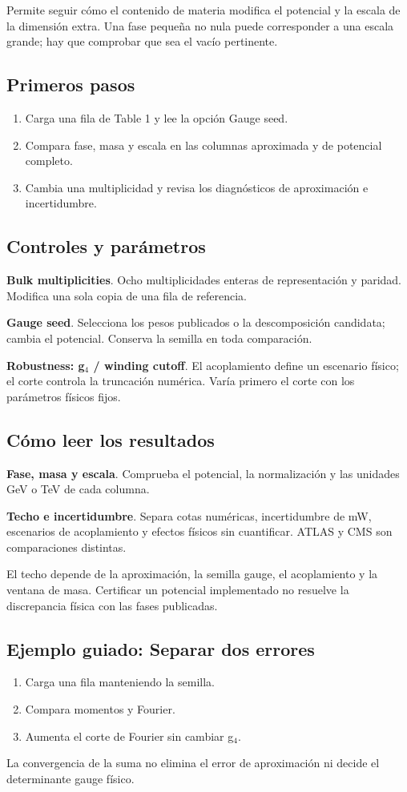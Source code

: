 \documentclass[11pt,a4paper]{article}
\begin{document}
Permite seguir cómo el contenido de materia modifica el potencial y la escala de la dimensión extra. Una fase pequeña no nula puede corresponder a una escala grande; hay que comprobar que sea el vacío pertinente.
\subsection*{Primeros pasos}
\begin{enumerate}
\item Carga una fila de Table 1 y lee la opción Gauge seed.
\item Compara fase, masa y escala en las columnas aproximada y de potencial completo.
\item Cambia una multiplicidad y revisa los diagnósticos de aproximación e incertidumbre.
\end{enumerate}
\subsection*{Controles y parámetros}
\textbf{Bulk multiplicities}. Ocho multiplicidades enteras de representación y paridad. Modifica una sola copia de una fila de referencia.

\textbf{Gauge seed}. Selecciona los pesos publicados o la descomposición candidata; cambia el potencial. Conserva la semilla en toda comparación.

\textbf{Robustness: g\ensuremath{{}_{4}} / winding cutoff}. El acoplamiento define un escenario físico; el corte controla la truncación numérica. Varía primero el corte con los parámetros físicos fijos.

\subsection*{Cómo leer los resultados}
\textbf{Fase, masa y escala}. Comprueba el potencial, la normalización y las unidades GeV o TeV de cada columna.

\textbf{Techo e incertidumbre}. Separa cotas numéricas, incertidumbre de mW, escenarios de acoplamiento y efectos físicos sin cuantificar. ATLAS y CMS son comparaciones distintas.

El techo depende de la aproximación, la semilla gauge, el acoplamiento y la ventana de masa. Certificar un potencial implementado no resuelve la discrepancia física con las fases publicadas.
\subsection*{Ejemplo guiado: Separar dos errores}
\begin{enumerate}
\item Carga una fila manteniendo la semilla.
\item Compara momentos y Fourier.
\item Aumenta el corte de Fourier sin cambiar g\ensuremath{{}_{4}}.
\end{enumerate}
La convergencia de la suma no elimina el error de aproximación ni decide el determinante gauge físico.
\end{document}
